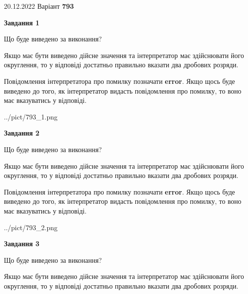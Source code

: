 \documentclass[12pt, ukrainian]{article}
\begin{document}
{20.12.2022 Варіант \No \textbf { 793 }\par}
{
\begin {Large}

{\begin {center}\textbf{Завдання 1}\end {center}}\par
Що буде виведено за виконання? \par

Якщо має бути виведено дійсне значення та інтерпретатор має здійснювати його округлення, 
то у відповіді достатньо правильно вказати два дробових розряди.

Повідомлення інтерпретатора про помилку позначати \textbf{error}.
Якщо щось буде виведено до того, як інтерпретатор видасть повідомлення про помилку, 
то воно має вказуватись у відповіді. \par

\begin{center}
	{../pict/793_1.png}
\end{center}
\newpage

{\begin {center}\textbf{Завдання 2}\end {center}}\par
Що буде виведено за виконання? \par

Якщо має бути виведено дійсне значення та інтерпретатор має здійснювати його округлення, 
то у відповіді достатньо правильно вказати два дробових розряди.

Повідомлення інтерпретатора про помилку позначати \textbf{error}.
Якщо щось буде виведено до того, як інтерпретатор видасть повідомлення про помилку, 
то воно має вказуватись у відповіді. \par

\begin{center}
	{../pict/793_2.png}
\end{center}
\newpage

{\begin {center}\textbf{Завдання 3}\end {center}}\par
Що буде виведено за виконання? \par

Якщо має бути виведено дійсне значення та інтерпретатор має здійснювати його округлення, 
то у відповіді достатньо правильно вказати два дробових розряди.


\end{Large}}
\end{document}
